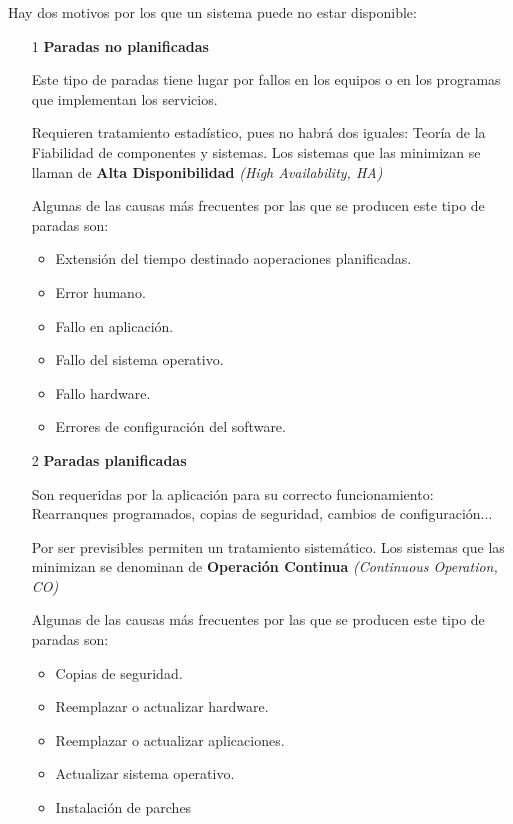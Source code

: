 Hay dos motivos por los que un sistema puede no estar disponible:
\begin{enumerate}
\item[1] \textbf{Paradas no planificadas}

Este tipo de paradas tiene lugar por fallos en los equipos o en los programas que implementan los servicios.

Requieren tratamiento estadístico, pues no habrá dos iguales: Teoría de la Fiabilidad de componentes y sistemas. Los sistemas que las minimizan se llaman de \textbf{Alta Disponibilidad} \textit{(High Availability, HA)}

\newpage

Algunas de las causas más frecuentes por las que se producen este tipo de paradas son:

\begin{itemize}
\item Extensión del tiempo destinado aoperaciones planificadas.
\item Error humano.
\item Fallo en aplicación.
\item Fallo del sistema operativo.
\item Fallo hardware.
\item Errores de configuración del software.
\end{itemize}

\item[2] \textbf{Paradas planificadas}

Son requeridas por la aplicación para su correcto funcionamiento: Rearranques programados, copias de seguridad, cambios de configuración...

Por ser previsibles permiten un tratamiento sistemático. Los sistemas que las minimizan se denominan de \textbf{Operación Continua} \textit{(Continuous Operation, CO)}

Algunas de las causas más frecuentes por las que se producen este tipo de paradas son:

\begin{itemize}
\item Copias de seguridad.
\item Reemplazar o actualizar hardware.
\item Reemplazar o actualizar aplicaciones.
\item Actualizar sistema operativo.
\item Instalación de parches
\end{itemize}
\end{enumerate}

